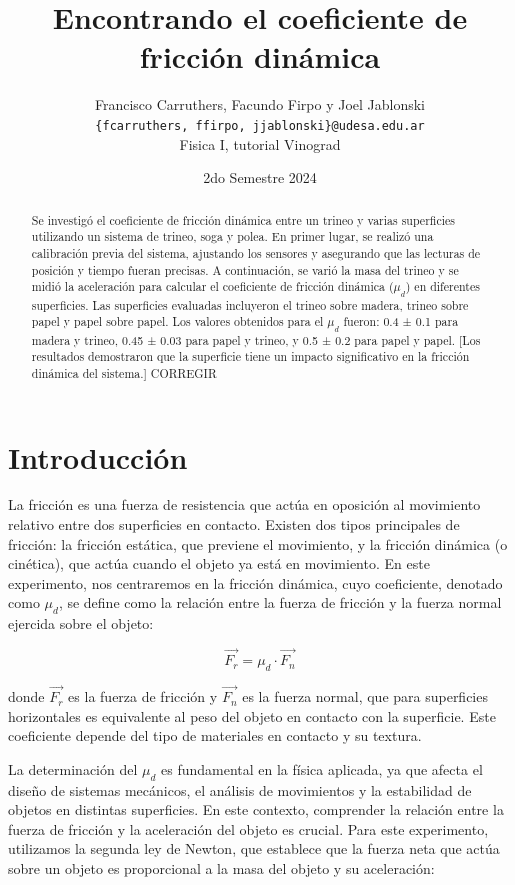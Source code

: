 \documentclass[12pt,a4]{article}
\title{Encontrando el coeficiente de fricción dinámica}
\author{Francisco Carruthers, Facundo Firpo y Joel Jablonski\\ [2mm]
\small \texttt{\{fcarruthers, ffirpo, jjablonski\}@udesa.edu.ar}\\
\small Fisica I, tutorial Vinograd}
\date{2do Semestre 2024}
\begin{document}
\maketitle

\begin{abstract}
    Se investigó el coeficiente de fricción dinámica entre un trineo y varias superficies utilizando un sistema de trineo, soga y polea. En primer lugar, se realizó una calibración previa del sistema, ajustando los sensores y asegurando que las lecturas de posición y tiempo fueran precisas. A continuación, se varió la masa del trineo y se midió la aceleración para calcular el coeficiente de fricción dinámica ($\mu_d$) en diferentes superficies. Las superficies evaluadas incluyeron el trineo sobre madera, trineo sobre papel y papel sobre papel. Los valores obtenidos para el $\mu_d$ fueron: 0.4 ± 0.1 para madera y trineo, 0.45 ± 0.03 para papel y trineo, y 0.5 ± 0.2 para papel y papel. [Los resultados demostraron que la superficie tiene un impacto significativo en la fricción dinámica del sistema.] CORREGIR
\end{abstract}

\section{Introducción}

La fricción es una fuerza de resistencia que actúa en oposición al movimiento relativo entre dos superficies en contacto. Existen dos tipos principales de fricción: la fricción estática, que previene el movimiento, y la fricción dinámica (o cinética), que actúa cuando el objeto ya está en movimiento. En este experimento, nos centraremos en la fricción dinámica, cuyo coeficiente, denotado como \(\mu_d\), se define como la relación entre la fuerza de fricción y la fuerza normal ejercida sobre el objeto:

\[
\vec{F_r} = \mu_d \cdot \vec{F_n}
\]

donde \(\vec{F_r}\) es la fuerza de fricción y \(\vec{F_n}\) es la fuerza normal, que para superficies horizontales es equivalente al peso del objeto en contacto con la superficie. Este coeficiente depende del tipo de materiales en contacto y su textura.

La determinación del $\mu_d$ es fundamental en la física aplicada, ya que afecta el diseño de sistemas mecánicos, el análisis de movimientos y la estabilidad de objetos en distintas superficies. En este contexto, comprender la relación entre la fuerza de fricción y la aceleración del objeto es crucial. Para este experimento, utilizamos la segunda ley de Newton, que establece que la fuerza neta que actúa sobre un objeto es proporcional a la masa del objeto y su aceleración:
\end{document}
